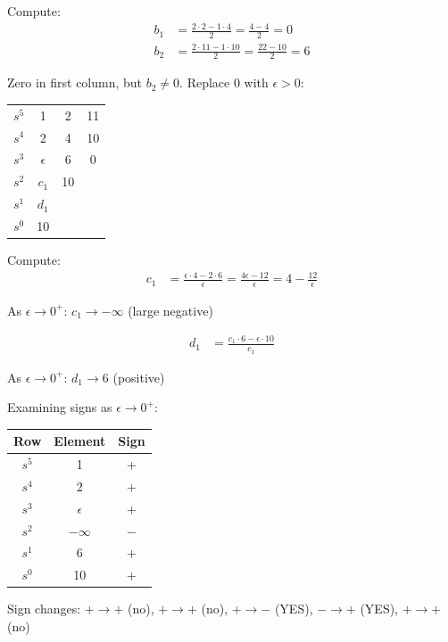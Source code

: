 Compute:
\begin{align*}
b_1 &= \frac{2 \cdot 2 - 1 \cdot 4}{2} = \frac{4-4}{2} = 0 \\
b_2 &= \frac{2 \cdot 11 - 1 \cdot 10}{2} = \frac{22-10}{2} = 6
\end{align*}

Zero in first column, but $b_2 \neq 0$. Replace 0 with $\epsilon > 0$:
\begin{center}
\begin{tabular}{c|ccc}
\toprule
$s^5$ & 1 & 2 & 11 \\
$s^4$ & 2 & 4 & 10 \\
$s^3$ & $\epsilon$ & 6 & 0 \\
$s^2$ & $c_1$ & 10 & \\
$s^1$ & $d_1$ & & \\
$s^0$ & 10 & & \\
\bottomrule
\end{tabular}
\end{center}

Compute:
\begin{align*}
c_1 &= \frac{\epsilon \cdot 4 - 2 \cdot 6}{\epsilon} = \frac{4\epsilon - 12}{\epsilon} = 4 - \frac{12}{\epsilon}
\end{align*}

As $\epsilon \to 0^+$: $c_1 \to -\infty$ (large negative)

\begin{align*}
d_1 &= \frac{c_1 \cdot 6 - \epsilon \cdot 10}{c_1}
\end{align*}

As $\epsilon \to 0^+$: $d_1 \to 6$ (positive)

Examining signs as $\epsilon \to 0^+$:
\begin{center}
\begin{tabular}{c|c|c}
\toprule
Row & Element & Sign \\
\midrule
$s^5$ & 1 & + \\
$s^4$ & 2 & + \\
$s^3$ & $\epsilon$ & + \\
$s^2$ & $-\infty$ & $-$ \\
$s^1$ & 6 & + \\
$s^0$ & 10 & + \\
\bottomrule
\end{tabular}
\end{center}

Sign changes: $+ \to +$ (no), $+ \to +$ (no), $+ \to -$ (YES), $- \to +$ (YES), $+ \to +$ (no)

